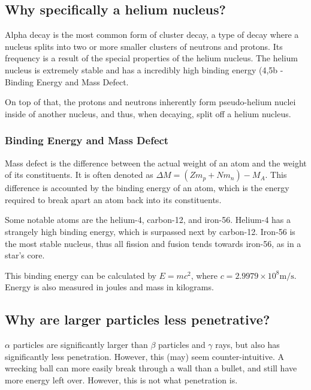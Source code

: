 \documentclass[
]{article}
\begin{document}
\hypertarget{why-specifically-a-helium-nucleus}{%
\subsection{Why specifically a helium
nucleus?}\label{why-specifically-a-helium-nucleus}}

Alpha decay is the most common form of cluster decay, a type of decay
where a nucleus splits into two or more smaller clusters of neutrons and
protons. Its frequency is a result of the special properties of the
helium nucleus. The helium nucleus is extremely stable and has a
incredibly high binding energy (4,5b - Binding Energy and Mass Defect.

On top of that, the protons and neutrons inherently form pseudo-helium
nuclei inside of another nucleus, and thus, when decaying, split off a
helium nucleus.

\hypertarget{binding-energy-and-mass-defect}{%
\subsubsection{Binding Energy and Mass
Defect}\label{binding-energy-and-mass-defect}}

Mass defect is the difference between the actual weight of an atom and
the weight of its constituents. It is often denoted as
{\(\Delta M = (Zm_{p} + Nm_{n}) - M_{A}\)}. This difference is accounted
by the binding energy of an atom, which is the energy required to break
apart an atom back into its constituents.

Some notable atoms are the helium-4, carbon-12, and iron-56. Helium-4
has a strangely high binding energy, which is surpassed next by
carbon-12. Iron-56 is the most stable nucleus, thus all fission and
fusion tends towards iron-56, as in a star's core.

This binding energy can be calculated by {\(E = mc^{2}\)}, where
{\(c = 2.9979 \times 10^{8}\text{m/s}\)}. Energy is also measured in
joules and mass in kilograms.

\hypertarget{why-are-larger-particles-less-penetrative}{%
\subsection{Why are larger particles less
penetrative?}\label{why-are-larger-particles-less-penetrative}}

{\(\alpha\)} particles are significantly larger than {\(\beta\)}
particles and {\(\gamma\)} rays, but also has significantly less
penetration. However, this (may) seem counter-intuitive. A wrecking ball
can more easily break through a wall than a bullet, and still have more
energy left over. However, this is not what penetration is.
\end{document}
